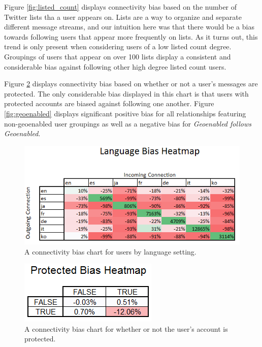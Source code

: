 Figure \ref{fig:listed_count} displays connectivity bias based on the number of Twitter lists tha a user appears on.  Lists are a way to organize and separate different message streams, and our intuition here was that there would be a bias towards following users that appear more frequently on lists.  As it turns out, this trend is only present when considering users of a low listed count degree.  Groupings of users that appear on over 100 lists display a consistent and considerable bias against following other high degree listed count users.

Figure \ref{fig:protected} displays connectivity bias based on whether or not a user's messages are protected.  The only considerable bias displayed in this chart is that users with protected accounts are biased against following one another.  Figure \ref{fig:geoenabled} displays significant positive bias for all relationships featuring non-geoenabled user groupings as well as a negative bias for \textit{Geoenabled follows Geoenabled}.


\begin{figure}[t]
 \centering
 \includegraphics[bb=0 0 424 194, scale=.5]{./images/Bates-Final/lang.png}
 \caption{A connectivity bias chart for users by language setting.}
 \label{fig:lang}
\end{figure}

\begin{figure}[t]
 \centering
 \includegraphics[bb=0 0 188 86, scale=.5]{./images/protected.png}
 \caption{A connectivity bias chart for whether or not the user's account is protected.}
 \label{fig:protected}
\end{figure}

